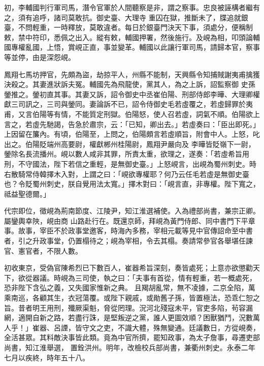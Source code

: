 \begin{pinyinscope}
 初，李輔國判行軍司馬，潛令官軍於人間聽察是非，謂之察事。忠良被誣構者繼有之，須有追呼，諸司莫敢抗。御史臺、大理寺
 重囚在獄，推斷未了，牒追就銀臺，不問輕重，一時釋放，莫敢違者。每日於銀臺門決天下事，須處分，便稱制敕，禁中符印，悉佩之出入。縱有敕，輔國押署，然後施行。及峴為相，叩頭論輔國專權亂國，上悟，賞峴正直，事並變革。輔國以此讓行軍司馬，請歸本官，察事等並停，由是深怨峴。



 鳳翔七馬坊押官，先頗為盜，劫掠平人，州縣不能制，天興縣令知捕賊謝夷甫擒獲決殺之。其妻進狀訴夫冤。輔國先為飛龍使，黨其人，為之上訴，詔監察御
 史孫鎣推之。鎣初直其事。其妻又訴，詔令御史中丞崔伯陽、刑部侍郎李曄、大理卿權獻三司訊之，三司與鎣同。妻論訴不已，詔令侍御史毛若虛覆之，若虛歸罪於夷甫，又言伯陽等有情，不能質定刑獄。伯陽怒，使人召若虛，詞氣不順。伯陽欲上言之，若虛先馳謁，告急於肅宗，云：「已知，卿出去。」若虛奏曰：「臣出即死。」上因留在簾內。有頃，伯陽至，上問之，伯陽頗言若虛順旨，附會中人。上怒，叱出之。伯陽貶端州高要尉，權獻郴州桂陽尉，鳳翔尹嚴向及
 李曄皆貶嶺下一尉，鎣除名長流播州。峴以數人咸非其罪，所責太重，欲理之，遂奏：「若虛希旨用刑，不守國法，陛下若信之重輕，是無御史臺。」上怒峴言，出峴為蜀州刺史。時右散騎常侍韓擇木入對，上謂之曰：「峴欲專權耶？何乃云任毛若虛是無御史臺也？令貶蜀州刺史，朕自覺用法太寬。」擇木對曰：「峴言直，非專權。陛下寬之，祗益聖德爾。」



 代宗即位，徵峴為荊南節度、江陵尹，知江淮選補使。入為禮部尚書，兼宗正卿。屬鑾輿幸陜，峴由商
 山路赴行在。既還京師，拜峴為黃門侍郎、同中書門下平章事。故事，宰臣不於政事堂邀客，時海內多務，宰相元載等見中官傳詔命至中書者，引之升政事堂，仍置榻待之；峴為宰相，令去其榻。奏請常參官各舉堪任諫官、憲官者，不限人數。



 初收東京，受偽官陳希烈已下數百人，崔器希旨深刻，奏皆處死；上意亦欲懲勸天下，欲從器議。時峴為三司使，執之曰：「夫事有首從，情有輕重，若一概處死，恐非陛下含弘之義，又失國家惟新之典。
 且羯胡亂常，無不凌據，二京全陷，萬乘南巡，各顧其生，衣冠蕩覆。或陛下親戚，或勛舊子孫，皆置極法，恐乖仁恕之旨。昔者明王用刑，殲厥渠魁，脅從罔理。況河北殘寇未平，官吏多陷，茍容漏網，適開自新之路，若盡行誅，是堅叛逆之黨，誰人更圖效順？困獸猶鬥，況數萬人乎！」崔器、呂諲，皆守文之吏，不識大體，殊無變通。廷議數日，方從峴奏，全活甚眾。其料敵決事皆此類。竟為中官所擠，罷知政事，為太子詹事，尋遷吏部尚書，知江淮舉選，
 置銓洪州。明年，改檢校兵部尚書，兼衢州刺史。永泰二年七月以疾終，時年五十八。




\end{pinyinscope}
